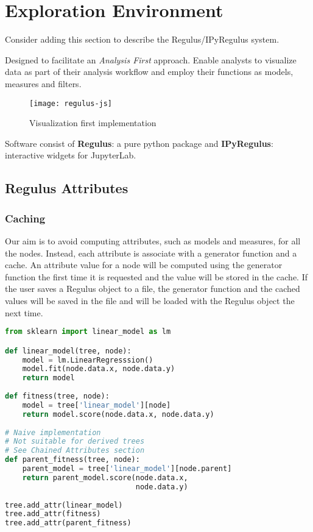 \section{Exploration Environment}
\label{sec:app}

Consider adding this section to describe the Regulus/IPyRegulus system.

Designed to facilitate an \textit{Analysis First} approach. Enable analysts to visualize data as part of their analysis workflow and employ their functions as models, measures and filters. 

\begin{figure}
    \centering
    \texttt{[image: regulus-js]}
    \caption{Visualization first implementation}
    \label{fig:regulus-js}
\end{figure}

Software consist of \textbf{Regulus}: a pure python package and \textbf{IPyRegulus}: interactive widgets for JupyterLab. 

\subsection{Regulus Attributes}
\label{sec:attr-impl}

\subsubsection{Caching}
\label{sec:caching}
Our aim is to avoid computing attributes, such as models and measures, for all the nodes. Instead, each attribute is associate with a generator function and a cache. An attribute value for a node will be computed using the generator function the first time it is requested and the value will be stored in the cache. If the user saves a Regulus object to a file, the generator function and the cached values will be saved in the file and will be loaded with the Regulus object the next time.

\begin{lstlisting}[language=Python, caption=Attributes can be used to reduce computations., float=htb, label='fig:model-fitness]
from sklearn import linear_model as lm

def linear_model(tree, node):
    model = lm.LinearRegresssion()
    model.fit(node.data.x, node.data.y)
    return model
    
def fitness(tree, node):
    model = tree['linear_model'][node]
    return model.score(node.data.x, node.data.y)
 
# Naive implementation 
# Not suitable for derived trees
# See Chained Attributes section
def parent_fitness(tree, node):
    parent_model = tree['linear_model'][node.parent]
    return parent_model.score(node.data.x, 
                              node.data.y)
    
tree.add_attr(linear_model)
tree.add_attr(fitness)
tree.add_attr(parent_fitness)
\end{lstlisting}

